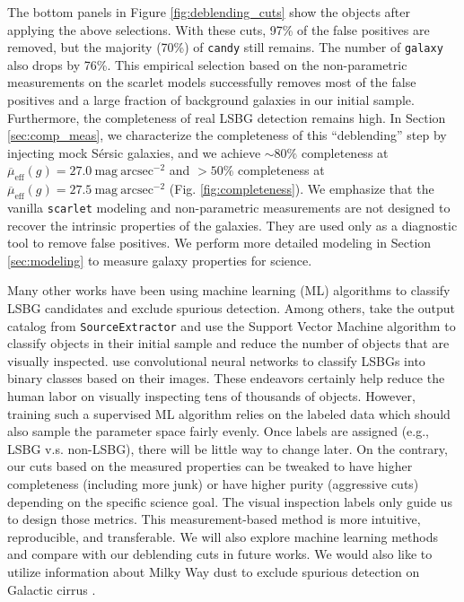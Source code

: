 \documentclass[twocolumn,astrosymb,twocolappendix]{aastex631}
\newcommand{\sbunit}{\mathrm{mag\ arcsec}^{-2}}
\newcommand{\sbeff}{\overline{\mu}_{\mathrm{eff}}(g)}
\newcommand{\code}[1]{\texttt{#1}}
\newcommand{\sersic}{S\'ersic}
\begin{document}
\begin{CJK*}{UTF8}{gbsn}
The bottom panels in Figure \ref{fig:deblending_cuts} show the objects after applying the above selections. With these cuts, 97\% of the false positives are removed, but the majority (70\%) of \code{candy} still remains. The number of \code{galaxy} also drops by 76\%. This empirical selection based on the non-parametric measurements on the scarlet models successfully removes most of the false positives and a large fraction of background galaxies in our initial sample. Furthermore, the completeness of real LSBG detection remains high. In Section \ref{sec:comp_meas}, we characterize the completeness of this ``deblending'' step by injecting mock \sersic{} galaxies, and we achieve $\sim80\%$ completeness at $\sbeff = 27.0\ \sbunit$ and $>50\%$ completeness at $\sbeff = 27.5\ \sbunit$ (Fig. \ref{fig:completeness}). We emphasize that the vanilla \code{scarlet} modeling and non-parametric measurements are not designed to recover the intrinsic properties of the galaxies. They are used only as a diagnostic tool to remove false positives. We perform more detailed modeling in Section \ref{sec:modeling} to measure galaxy properties for science. 


Many other works have been using machine learning (ML) algorithms to classify LSBG candidates and exclude spurious detection. Among others, \citet{Tanoglidis2021} take the output catalog from \code{SourceExtractor} and use the Support Vector Machine algorithm to classify objects in their initial sample and reduce the number of objects that are visually inspected. \citet{Zaritsky2019,Zaritsky2021,Zaritsky2022} use convolutional neural networks to classify LSBGs into binary classes based on their images. These endeavors certainly help reduce the human labor on visually inspecting tens of thousands of objects. However, training such a supervised ML algorithm relies on the labeled data which should also sample the parameter space fairly evenly. Once labels are assigned (e.g., LSBG v.s. non-LSBG), there will be little way to change later. On the contrary, our cuts based on the measured properties can be tweaked to have higher completeness  (including more junk) or have higher purity (aggressive cuts) depending on the specific science goal. The visual inspection labels only guide us to design those metrics. This measurement-based method is more intuitive, reproducible, and transferable. We will also explore machine learning methods and compare with our deblending cuts in future works. We would also like to utilize information about Milky Way dust to exclude spurious detection on Galactic cirrus \citep[e.g.,][]{Zaritsky2021,Zaritsky2022}.


\end{CJK*}
\end{document}
